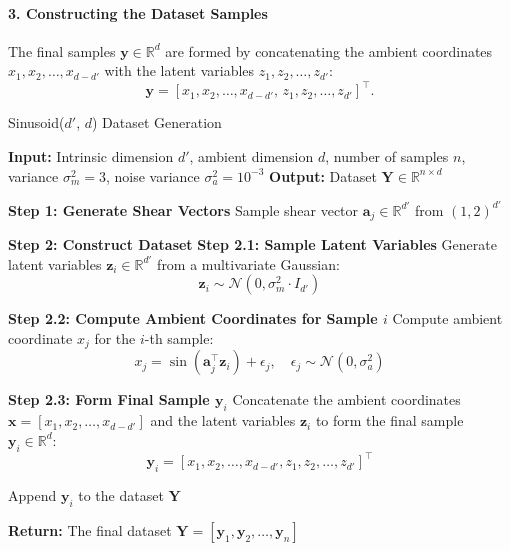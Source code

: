 \paragraph{3. Constructing the Dataset Samples}

The final samples $\mathbf{y} \in \mathbb{R}^d$ are formed by concatenating the ambient coordinates $x_1, x_2, \dots, x_{d-d'}$ with the latent variables $z_1, z_2, \dots, z_{d'}$:
\[
\mathbf{y} = \left[ x_1, x_2, \dots, x_{d-d'}, \, z_1, z_2, \dots, z_{d'} \right]^\top.
\]

\begin{algorithm}
    \caption{Sinusoid($d'$, $d$) Dataset Generation}
    \begin{algorithmic}[1]
        \STATE \textbf{Input:} Intrinsic dimension $d'$, ambient dimension $d$, number of samples $n$, variance $\sigma_m^2 = 3$, noise variance $\sigma_a^2 = 10^{-3}$
        \STATE \textbf{Output:} Dataset $\mathbf{Y} \in \mathbb{R}^{n \times d}$

        \STATE \textbf{Step 1: Generate Shear Vectors}
            \STATE Sample shear vector $\mathbf{a}_j \in \mathbb{R}^{d'}$ from $(1, 2)^{d'}$
        \ENDFOR

        \STATE \textbf{Step 2: Construct Dataset}
            \STATE \textbf{Step 2.1: Sample Latent Variables}
            \STATE Generate latent variables $\mathbf{z}_i \in \mathbb{R}^{d'}$ from a multivariate Gaussian:
            \[
            \mathbf{z}_i \sim \mathcal{N}(0, \sigma_m^2 \cdot I_{d'})
            \]

            \STATE \textbf{Step 2.2: Compute Ambient Coordinates for Sample $i$}
                \STATE Compute ambient coordinate $x_j$ for the $i$-th sample:
                \[
                x_j = \sin\left( \mathbf{a}_j^\top \mathbf{z}_i \right) + \epsilon_j, \quad \epsilon_j \sim \mathcal{N}(0, \sigma_a^2)
                \]
            \ENDFOR

            \STATE \textbf{Step 2.3: Form Final Sample $\mathbf{y}_i$}
            \STATE Concatenate the ambient coordinates $\mathbf{x} = [x_1, x_2, \dots, x_{d-d'}]$ and the latent variables $\mathbf{z}_i$ to form the final sample $\mathbf{y}_i \in \mathbb{R}^d$:
            \[
            \mathbf{y}_i = [x_1, x_2, \dots, x_{d-d'}, z_1, z_2, \dots, z_{d'}]^\top
            \]

            \STATE Append $\mathbf{y}_i$ to the dataset $\mathbf{Y}$
        \ENDFOR
        
        \STATE \textbf{Return:} The final dataset $\mathbf{Y} = [\mathbf{y}_1, \mathbf{y}_2, \dots, \mathbf{y}_n]$
    \end{algorithmic}
\end{algorithm}

